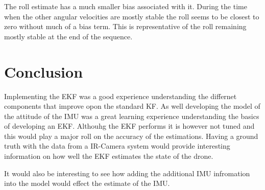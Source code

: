 \documentclass[letter]{IEEEtran}
\begin{document}
The roll estimate has a much smaller bias associated with it. During the time when the other angular velocities are mostly stable the roll seems to be closest to zero without much of a bias term. This is representative of the roll remaining mostly stable at the end of the sequence.

\section{Conclusion}
Implementing the EKF was a good experience understanding the differnet components that improve opon the standard KF. As well developing the model of the attitude of the IMU was a great learning experience understanding the basics of developing an EKF. Althouhg the EKF performs it is however not tuned and this would play a major roll on the accuracy of the estimations. Having a ground truth with the data from a IR-Camera system would provide interesting information on how well the EKF estimates the state of the drone.

It would also be interesting to see how adding the additional IMU infromation into the model would effect the estimate of the IMU.
\end{document}
